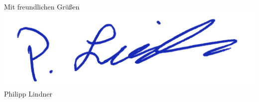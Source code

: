 \documentclass[sans,11pt,a4paper]{moderncv}
\begin{document}
Mit freundlichen Grüßen\\
\includegraphics[scale=0.75]{Unterschrift} %
\\Philipp Lindner

\closesection{}                   %
\end{document}
